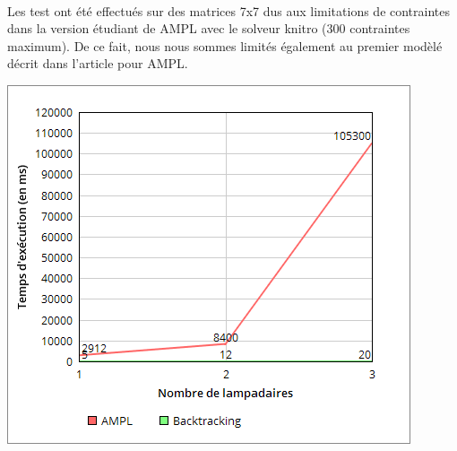  \paragraph{} Les test ont été effectués sur des matrices 7x7 dus aux limitations de contraintes dans la version étudiant de AMPL avec le solveur knitro (300 contraintes maximum).  De ce fait, nous nous sommes limités également au premier modèlé décrit dans l'article pour AMPL.

\includegraphics[scale=0.75]{./image/graphiqueTemps.png}


